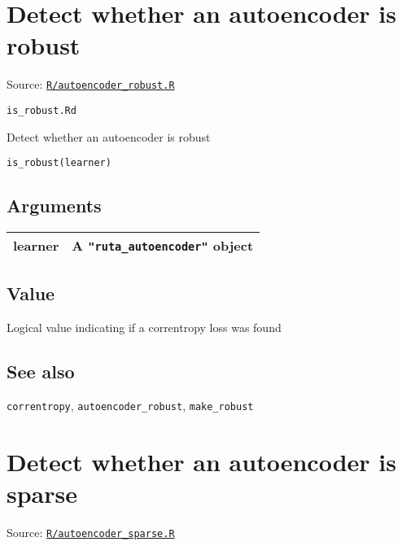 \section{Detect whether an autoencoder is
robust}\label{detect-whether-an-autoencoder-is-robust}

Source:
\href{https://github.com/fdavidcl/ruta/blob/master/R/autoencoder_robust.R}{\texttt{R/autoencoder\_robust.R}}

\texttt{is\_robust.Rd}

Detect whether an autoencoder is robust

\begin{verbatim}
is_robust(learner)
\end{verbatim}

\hypertarget{arguments}{\subsection{\texorpdfstring{\protect\hyperlink{arguments}{}Arguments}{Arguments}}\label{arguments}}

\begin{longtable}[c]{@{}ll@{}}
\toprule
learner & A \texttt{"ruta\_autoencoder"} object\tabularnewline
\bottomrule
\end{longtable}

\hypertarget{value}{\subsection{\texorpdfstring{\protect\hyperlink{value}{}Value}{Value}}\label{value}}

Logical value indicating if a correntropy loss was found

\hypertarget{see-also}{\subsection{\texorpdfstring{\protect\hyperlink{see-also}{}See
also}{See also}}\label{see-also}}

\texttt{correntropy}, \texttt{autoencoder\_robust},
\texttt{make\_robust}

\section{Detect whether an autoencoder is
sparse}\label{detect-whether-an-autoencoder-is-sparse}

Source:
\href{https://github.com/fdavidcl/ruta/blob/master/R/autoencoder_sparse.R}{\texttt{R/autoencoder\_sparse.R}}

